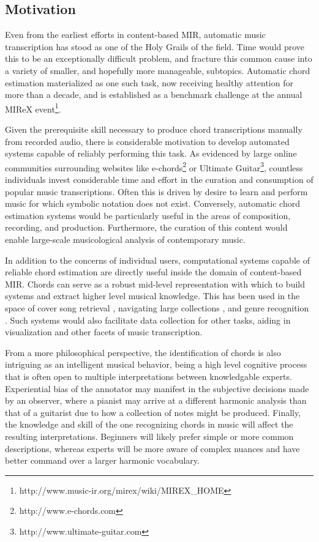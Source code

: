 \subsection{Motivation}
\label{subsec:motivation}

Even from the earliest efforts in content-based MIR, automatic music transcription has stood as one of the Holy Grails of the field.
Time would prove this to be an exceptionally difficult problem, and fracture this common cause into a variety of smaller, and hopefully more manageable, subtopics.
Automatic chord estimation materialized as one such task, now receiving healthy attention for more than a decade, and is established as a benchmark challenge at the annual MIReX event\footnote{{http://www.music-ir.org/mirex/wiki/MIREX\_HOME}}.

Given the prerequisite skill necessary to produce chord transcriptions manually from recorded audio, there is considerable motivation to develop automated systems capable of reliably performing this task.
As evidenced by large online communities surrounding websites like e-chords\footnote{http://www.e-chords.com} or Ultimate Guitar\footnote{http://www.ultimate-guitar.com}, countless individuals invest considerable time and effort in the curation and consumption of popular music transcriptions.
Often this is driven by desire to learn and perform music for which symbolic notation does not exist.
Conversely, automatic chord estimation systems would be particularly useful in the areas of composition, recording, and production.
Furthermore, the curation of this content would enable large-scale musicological analysis of contemporary music.

In addition to the concerns of individual users, computational systems capable of reliable chord estimation are directly useful inside the domain of content-based MIR.
Chords can serve as a robust mid-level representation with which to build systems and extract higher level musical knowledge.
This has been used in the space of cover song retrieval \cite{Juan?}, navigating large collections \cite{alan?}, and genre recognition \cite{anglade}.
Such systems would also facilitate data collection for other tasks, aiding in visualization and other facets of music transcription.

From a more philosophical perspective, the identification of chords is also intriguing as an intelligent musical behavior, being a high level cognitive process that is often open to multiple interpretations between knowledgable experts.
Experiential bias of the annotator may manifest in the subjective decisions made by an observer, where a pianist may arrive at a different harmonic analysis than that of a guitarist due to how a collection of notes might be produced.
Finally, the knowledge and skill of the one recognizing chords in music will affect the resulting interpretations.
Beginners will likely prefer simple or more common descriptions, whereas experts will be more aware of complex nuances and have better command over a larger harmonic vocabulary.


